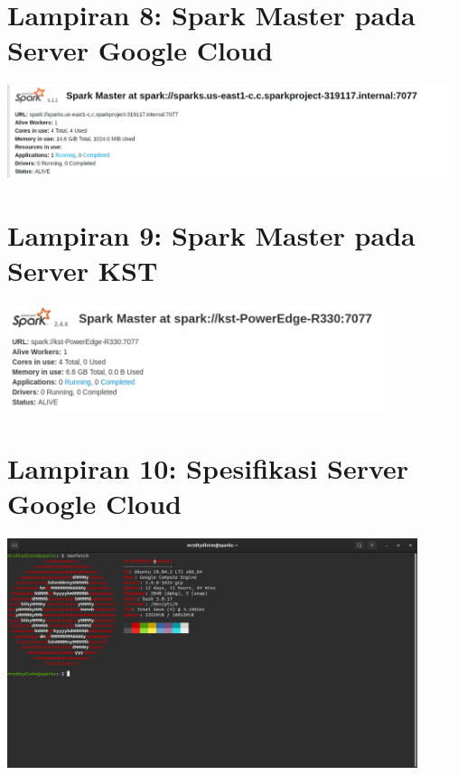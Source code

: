 \documentclass[12pt,a4paper]{report}
\begin{document}
\section*{Lampiran 8: Spark Master pada Server Google Cloud}
\begin{center}
	\includegraphics[width=13cm]{gambar/gcp.png}
\end{center}

\section*{Lampiran 9: Spark Master pada Server KST}
\begin{center}
	\includegraphics[width=11cm]{gambar/kst.png}
\end{center}

\section*{Lampiran 10: Spesifikasi Server Google Cloud}
\begin{center}
	\includegraphics[width=12cm]{gambar/neofetch-gcp.png}
\end{center}
\end{document}
